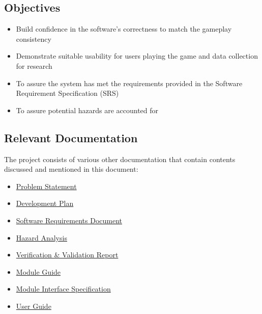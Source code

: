 \documentclass[12pt, titlepage]{article}
\begin{document}
\subsection{Objectives}

\begin{itemize}
    \item Build confidence in the software's correctness to match the gameplay consistency 
    \item Demonstrate suitable usability for users playing the game and data collection for research
    \item To assure the system has met the requirements provided in the Software Requirement Specification (SRS)
    \item To assure potential hazards are accounted for
\end{itemize}  

\subsection{Relevant Documentation}
The project consists of various other documentation that contain contents discussed and mentioned in this document:
\begin{itemize}
    \item \href{https://github.com/brandonduong/Farming-Matters/blob/main/docs/ProblemStatementAndGoals/ProblemStatement.pdf}{Problem Statement}
    \item \href{https://github.com/brandonduong/Farming-Matters/blob/main/docs/ProblemStatementAndGoals/ProblemStatement.pdf}{Development Plan}
    \item \href{https://github.com/brandonduong/Farming-Matters/blob/main/docs/DevelopmentPlan/DevelopmentPlan.pdf}{Software Requirements Document}
    \item \href{https://github.com/brandonduong/Farming-Matters/blob/main/docs/HazardAnalysis/HazardAnalysis.pdf}{Hazard Analysis}
    \item \href{https://github.com/brandonduong/Farming-Matters/blob/main/docs/VnVReport/VnVReport.pdf}{Verification \&  Validation Report}
    \item \href{https://github.com/brandonduong/Farming-Matters/blob/main/docs/Design/MG/MG.pdf}{Module Guide}
    \item \href{https://github.com/brandonduong/Farming-Matters/blob/main/docs/Design/MIS/MIS.pdf}{Module Interface Specification}
    \item \href{https://github.com/brandonduong/Farming-Matters/blob/main/docs/UserGuide/UserGuide.pdf}{User Guide}
\end{itemize}
\end{document}
